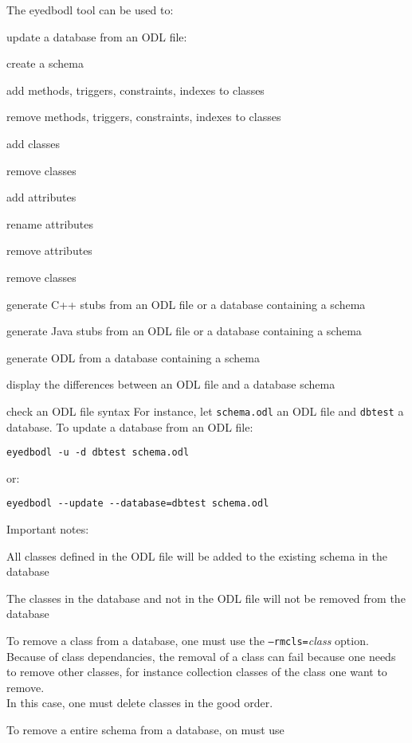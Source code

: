 The eyedbodl tool can be used to:
\bi
\item update a database from an ODL file:
\bi
\item create a schema
\item add methods, triggers, constraints, indexes to classes
\item remove methods, triggers, constraints, indexes to classes
\item add classes
\item remove classes
\item add attributes
\item rename attributes
\item remove attributes
\item remove classes
\ei
\item generate C++ stubs from an ODL file or a database containing
a schema
\item generate Java stubs from an ODL file or a database containing
a schema
\item generate ODL from a database containing a schema
\item display the differences between an ODL file and a database
schema
\item check an ODL file syntax
\ei
For instance, let \texttt{schema.odl} an ODL file and \texttt{dbtest}
a database.
To update a database from an ODL file:
\vspace{-2mm}
\begin{verbatim}
eyedbodl -u -d dbtest schema.odl
\end{verbatim}
or:
\vspace{-2mm}
\begin{verbatim}
eyedbodl --update --database=dbtest schema.odl
\end{verbatim}
Important notes:
\bi
\item All classes defined in the ODL file will be added to the
existing schema in the database
\item The classes in the database and not in the ODL file will not
be removed from the database
\item To remove a class from a database, one must use the
\texttt{--rmcls=}\emph{class} option. Because of class dependancies,
the removal of a class can fail because one needs to remove
other classes, for instance collection classes of the class one want
to remove.
\\
In this case, one must delete classes in the good order.
\item To remove a entire schema from a database, on must use
